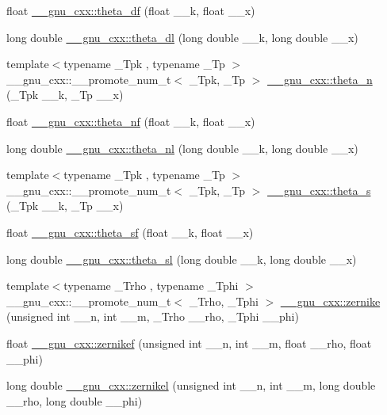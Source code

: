 \begin{DoxyCompactItemize}
\item 
float \hyperlink{group__gnu__math__spec__func_gad2dc6fcaf54d25cbfaad082623941118}{\+\_\+\+\_\+gnu\+\_\+cxx\+::theta\+\_\+df} (float \+\_\+\+\_\+k, float \+\_\+\+\_\+x)
\item 
long double \hyperlink{group__gnu__math__spec__func_gacce4474168b9638ebeaad1c7b351fa04}{\+\_\+\+\_\+gnu\+\_\+cxx\+::theta\+\_\+dl} (long double \+\_\+\+\_\+k, long double \+\_\+\+\_\+x)
\item 
{\footnotesize template$<$typename \+\_\+\+Tpk , typename \+\_\+\+Tp $>$ }\\\+\_\+\+\_\+gnu\+\_\+cxx\+::\+\_\+\+\_\+promote\+\_\+num\+\_\+t$<$ \+\_\+\+Tpk, \+\_\+\+Tp $>$ \hyperlink{group__gnu__math__spec__func_gaa2791768016201c6dab2984bf04ec4b4}{\+\_\+\+\_\+gnu\+\_\+cxx\+::theta\+\_\+n} (\+\_\+\+Tpk \+\_\+\+\_\+k, \+\_\+\+Tp \+\_\+\+\_\+x)
\item 
float \hyperlink{group__gnu__math__spec__func_ga5298a95e02bd909d55e59c1f2a0b51f8}{\+\_\+\+\_\+gnu\+\_\+cxx\+::theta\+\_\+nf} (float \+\_\+\+\_\+k, float \+\_\+\+\_\+x)
\item 
long double \hyperlink{group__gnu__math__spec__func_ga907f6c147387d55d2dfccbc58d1f1bc5}{\+\_\+\+\_\+gnu\+\_\+cxx\+::theta\+\_\+nl} (long double \+\_\+\+\_\+k, long double \+\_\+\+\_\+x)
\item 
{\footnotesize template$<$typename \+\_\+\+Tpk , typename \+\_\+\+Tp $>$ }\\\+\_\+\+\_\+gnu\+\_\+cxx\+::\+\_\+\+\_\+promote\+\_\+num\+\_\+t$<$ \+\_\+\+Tpk, \+\_\+\+Tp $>$ \hyperlink{group__gnu__math__spec__func_ga6eea3110c964e5d065d99f2e58a1ed56}{\+\_\+\+\_\+gnu\+\_\+cxx\+::theta\+\_\+s} (\+\_\+\+Tpk \+\_\+\+\_\+k, \+\_\+\+Tp \+\_\+\+\_\+x)
\item 
float \hyperlink{group__gnu__math__spec__func_ga5e69cf30c9a4cc057accc43e8c4bf7a3}{\+\_\+\+\_\+gnu\+\_\+cxx\+::theta\+\_\+sf} (float \+\_\+\+\_\+k, float \+\_\+\+\_\+x)
\item 
long double \hyperlink{group__gnu__math__spec__func_gac574077067a4e7b24a0a9ff2d537d885}{\+\_\+\+\_\+gnu\+\_\+cxx\+::theta\+\_\+sl} (long double \+\_\+\+\_\+k, long double \+\_\+\+\_\+x)
\item 
{\footnotesize template$<$typename \+\_\+\+Trho , typename \+\_\+\+Tphi $>$ }\\\+\_\+\+\_\+gnu\+\_\+cxx\+::\+\_\+\+\_\+promote\+\_\+num\+\_\+t$<$ \+\_\+\+Trho, \+\_\+\+Tphi $>$ \hyperlink{group__gnu__math__spec__func_gac43d89238752ed88927867236ab8c6a8}{\+\_\+\+\_\+gnu\+\_\+cxx\+::zernike} (unsigned int \+\_\+\+\_\+n, int \+\_\+\+\_\+m, \+\_\+\+Trho \+\_\+\+\_\+rho, \+\_\+\+Tphi \+\_\+\+\_\+phi)
\item 
float \hyperlink{group__gnu__math__spec__func_gababce1066ecef7258070b9b7fcea975f}{\+\_\+\+\_\+gnu\+\_\+cxx\+::zernikef} (unsigned int \+\_\+\+\_\+n, int \+\_\+\+\_\+m, float \+\_\+\+\_\+rho, float \+\_\+\+\_\+phi)
\item 
long double \hyperlink{group__gnu__math__spec__func_ga9236dd8545b448da9cb05dd8b7cf6811}{\+\_\+\+\_\+gnu\+\_\+cxx\+::zernikel} (unsigned int \+\_\+\+\_\+n, int \+\_\+\+\_\+m, long double \+\_\+\+\_\+rho, long double \+\_\+\+\_\+phi)
\end{DoxyCompactItemize}


